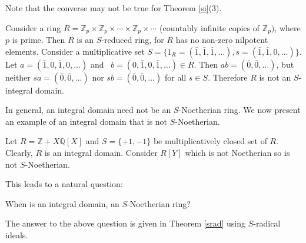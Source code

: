 \documentclass[11pt]{article}
\begin{document}
	Note that the converse may not be true for Theorem \ref{si}(3).
	\begin{eg}
		Consider a ring $R=\mathbb{Z}_{p}\times \mathbb{Z}_{p}\times\cdots\times\mathbb{Z}_{p}\times\cdots$ (countably infinite copies of $\mathbb{Z}_{p})$, where $p$ is prime. Then $R$ is an $S$-reduced ring, for $R$ has no non-zero nilpotent elements. Consider a multiplicative set $S=\{{1_R}=(\bar{1},\bar{1},\bar{1},\ldots), s=(\bar{1},\bar{1},0,\ldots)\}$. Let $a=(\bar{1}, 0, \bar{1}, 0, \ldots)$ and ~$b=(0, \bar{1}, 0, \bar{1}, \ldots)\in R$. Then $ab=(\bar{0}, \bar{0}, \ldots)$, but neither $sa=(\bar{0}, \bar{0}, \ldots)$ nor $sb=(\bar{0}, \bar{0}, \ldots)$ for all $s\in S$. Therefore $R$ is not an $S$-integral domain. 
	\end{eg}
	
	
	In general, an integral domain need not be an $S$-Noetherian ring. We now present an example of an integral domain that is not $S$-Noetherian.
\begin{eg}\label{sn}
		Let $R=\mathbb{Z}+X\mathbb{Q}[X]$ and $S=\{+1, -1\}$ be multiplicatively closed set of $R$. Clearly, $R$ is an integral domain. Consider \(R[Y]\) which is not Noetherian so is not $S$-Noetherian.
\end{eg}
	This leads to a natural question:
	\begin{question}
		When is an integral domain, an $S$-Noetherian ring?
	\end{question}
	The answer to the above question is given in Theorem \ref{srad} using $S$-radical ideals.
	
\end{document}
